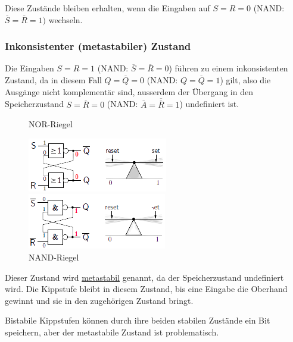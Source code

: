 \documentclass[12pt]{report}
\begin{document}
Diese Zustände bleiben erhalten, wenn die Eingaben auf $S=R=0$ (NAND: $\overline{S} = \overline{R} = 1)$ wechseln.

\subsubsection{Inkonsistenter (metastabiler) Zustand}
Die Eingaben $S=R=1$ (NAND: $\overline{S}=\overline{R}=0$) führen zu einem inkonsistenten Zustand,
da in diesem Fall $Q=\overline{Q}=0$ (NAND: $Q=\overline{Q}=1$) gilt,
also die Ausgänge nicht komplementär sind,
ausserdem der Übergang in den Speicherzustand $S=\overline{R}=0$ (NAND: $\overline{A}=\overline{\overline{R}}=1$) undefiniert ist.

\begin{figure}[H]
  \begin{minipage}[t]{0.48\textwidth}
    \caption{NOR-Riegel}
    \centering
    \includegraphics{riegel_nor_inconsistent}
  \end{minipage}
  \hfill
  \begin{minipage}[t]{0.48\textwidth}
    \caption{NAND-Riegel}
    \centering
    \includegraphics{riegel_nand_inconsistent}
  \end{minipage}
\end{figure}

Dieser Zustand wird \underline{metastabil} genannt, da der Speicherzustand undefiniert wird.
Die Kippstufe bleibt in diesem Zustand, bis eine Eingabe die Oberhand gewinnt und sie in den zugehörigen Zustand bringt.

\begin{infobox}
  Bistabile Kippstufen können durch ihre beiden stabilen Zustände ein Bit speichern,
  aber der metastabile Zustand ist problematisch.

\end{infobox}
\end{document}
